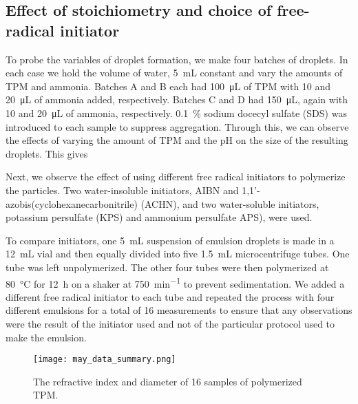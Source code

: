 \subsection{Effect of stoichiometry and choice of free-radical initiator}

To probe the variables of droplet formation, we make four batches of droplets.
In each case we hold the volume of water, \SI{5}{\milli \liter} constant 
and vary the amounts of TPM and ammonia. Batches A and B each had 
\SI{100}{\micro\liter} of TPM with \si{10} and \SI{20}{\micro\liter} of 
ammonia added, respectively. Batches C and D had \SI{150}{\micro\liter}, 
again with \si{10} and \SI{20}{\micro\liter} of ammonia, respectively. 
\SI{0.1}{\percent} sodium docecyl sulfate (SDS) was introduced to
each sample to suppress aggregation. Through this, we can observe the effects of
varying the amount of TPM and the pH on the size of the resulting droplets.
This gives 

Next, we observe the effect of using different free radical initiators 
to polymerize the particles. Two water-insoluble initiators, AIBN and
\num{1},\num{1}'-azobis(cyclohexanecarbonitrile) (ACHN), and two water-soluble 
initiators, potassium persulfate (KPS) and ammonium persulfate APS), were 
used.

To compare initiators, one \SI{5}{\milli \liter} suspension of emulsion droplets is
made in a \SI{12}{\milli \liter} vial and then equally divided into five
\SI{1.5}{\milli \liter} microcentrifuge tubes. One tube was left unpolymerized. The
other four tubes were then polymerized at \SI{80}{\celsius} 
for \SI{12}{\hour} on a shaker at \SI{750}{\minute^{-1}} %
to prevent sedimentation.
We added a different free radical initiator to each tube and repeated the process with four
different emulsions for a total of 
\num{16} measurements to ensure that any observations were the result of the 
initiator used and not of the particular protocol used to make the emulsion.



\begin{figure}
    \centering
    \texttt{[image: may\_data\_summary.png]}
    \caption{The refractive index and diameter of 16 samples of 
    polymerized TPM.}
    \label{fig:initiator_data}
\end{figure}

